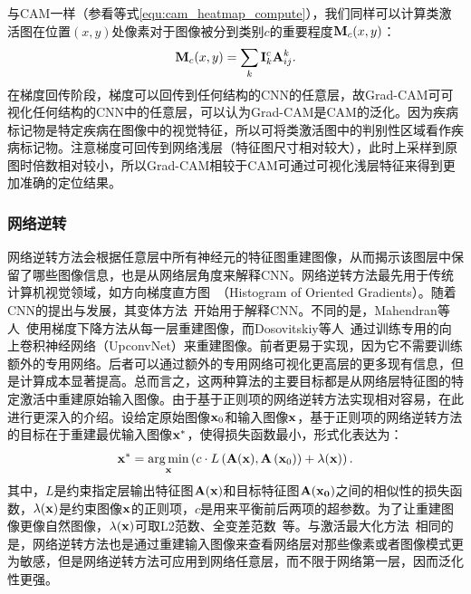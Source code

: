 与CAM一样（参看等式\ref{equ:cam_heatmap_compute}），我们同样可以计算类激活图在位置$(x,y)$处像素对于图像被分到类别$c$的重要程度$\mathbf{M}_c(x, y)$：
\begin{equation}\label{equ:grad_cam_heatmap_compute}
\mathbf{M}_{c}(x, y)=\sum_{k} \mathbf{I}_{k}^{c} \mathbf{A}^{k}_{ij}.
\end{equation}
在梯度回传阶段，梯度可以回传到任何结构的CNN的任意层，故Grad-CAM可可视化任何结构的CNN中的任意层，可以认为Grad-CAM是CAM的泛化。因为疾病标记物是特定疾病在图像中的视觉特征，所以可将类激活图中的判别性区域看作疾病标记物。注意梯度可回传到网络浅层（特征图尺寸相对较大），此时上采样到原图时倍数相对较小，所以Grad-CAM相较于CAM可通过可视化浅层特征来得到更加准确的定位结果。
\subsubsection*{网络逆转}
网络逆转方法会根据任意层中所有神经元的特征图重建图像，从而揭示该图层中保留了哪些图像信息，也是从网络层角度来解释CNN。网络逆转方法最先用于传统计算机视觉领域，如方向梯度直方图~\cite{dalal2005histograms}（Histogram of Oriented Gradients）。随着CNN的提出与发展，其变体方法~\cite{mahendran2015understanding, mahendran2016visualizing, dosovitskiy2016inverting}开始用于解释CNN。不同的是，Mahendran等人~\cite{mahendran2015understanding, mahendran2016visualizing}使用梯度下降方法从每一层重建图像，而Dosovitskiy等人~\cite{dosovitskiy2016inverting}通过训练专用的向上卷积神经网络（UpconvNet）来重建图像。前者更易于实现，因为它不需要训练额外的专用网络。后者可以通过额外的专用网络可视化更高层的更多现有信息，但是计算成本显著提高。总而言之，这两种算法的主要目标都是从网络层特征图的特定激活中重建原始输入图像。由于基于正则项的网络逆转方法实现相对容易，在此进行更深入的介绍。设给定原始图像$\mathbf{x}_0$和输入图像$\mathbf{x}$，基于正则项的网络逆转方法的目标在于重建最优输入图像$\mathbf{x}^*$，使得损失函数最小，形式化表达为：
\begin{equation}
\mathbf{x}^{*}=\underset{\mathbf{x}}{\operatorname{arg\, min}}\left(c \cdot {L}\left(\mathbf{A}(\mathbf{x}), \mathbf{A}\left(\mathbf{x}_{0}\right)\right)+\lambda(\mathbf{x})\right).
\end{equation}
其中，${L}$是约束指定层输出特征图$\mathbf{A}(\mathbf{x})$和目标特征图$\mathbf{A}(\mathbf{x_0})$之间的相似性的损失函数，$\lambda(\mathbf{x})$是约束图像$\mathbf{x}$的正则项，$c$是用来平衡前后两项的超参数。为了让重建图像更像自然图像，$\lambda(\mathbf{x})$可取L2范数、全变差范数~\cite{rudin1992nonlinear}等。与激活最大化方法~\cite{simonyan2013deep}相同的是，网络逆转方法也是通过重建输入图像来查看网络层对那些像素或者图像模式更为敏感，但是网络逆转方法可应用到网络任意层，而不限于网络第一层，因而泛化性更强。

